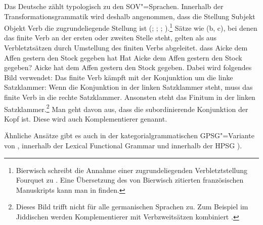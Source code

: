 Das Deutsche zählt typologisch zu den SOV"=Sprachen. Innerhalb der
Transformationsgrammatik 
wird deshalb angenommen, dass die Stellung Subjekt Objekt Verb die zugrundeliegende Stellung ist (\citealp{Bach62a}; \citealp*[]{Bierwisch63a};
\citealp{Reis74a}; \citealp[Kapitel~1]{Thiersch78a}).\footnote{%
  Bierwisch schreibt die Annahme einer zugrundeliegenden Verbletztstellung Fourquet
  zu \citep{Fourquet57a}. Eine Übersetzung des von Bierwisch zitierten
  französischen Manuskripts kann man in 
  finden.%
}
Sätze wie (b, c), bei denen das finite Verb an der ersten oder zweiten Stelle steht,
gelten als aus Verbletztsätzen durch Umstellung des finiten Verbs abgeleitet.
\eal
\ex dass Aicke dem Affen gestern den Stock gegeben hat
\ex Hat Aicke dem Affen gestern den Stock gegeben?
\ex Aicke hat dem Affen gestern den Stock gegeben.
\zl
Dabei wird folgendes Bild verwendet: Das finite Verb kämpft mit der Konjunktion um die linke Satzklammer:
Wenn die Konjunktion in der linken Satzklammer steht, muss das finite Verb in die rechte Satzklammer.
Ansonsten steht das Finitum in der linken Satzklammer.\footnote{
  Dieses Bild trifft nicht für alle germanischen Sprachen zu. Zum Beispiel im Jiddischen werden
  Komplementierer mit Verbzweitsätzen kombiniert \citep[]{Diesing2004a}.
} Man geht davon aus, dass die subordinierende Konjunktion
der Kopf ist. Diese wird auch Komplementierer genannt.

Ähnliche Ansätze gibt es auch in der kategorialgrammatischen GPSG"=Variante von \citet[]{Jacobs86a}, innerhalb der Lexical Functional Grammar \citep{Berman96a-u} und innerhalb der HPSG
\label{Seite-V1-via-Lexikonregel}\parencites{KW91a}{Oliva92b}{Netter92}{Frank94}{Kiss95a}{Feldhaus97}{Meurers2000b}{Mueller2005c,MuellerGS}).\addpages

